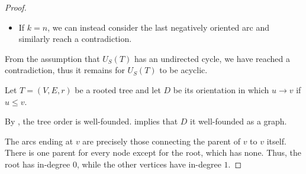 \begin{proof}
\begin{itemize}
    \item If \( k = n \), we can instead consider the last negatively oriented arc and similarly reach a contradiction.
  \end{itemize}

  From the assumption that \( U_S(T) \) has an undirected cycle, we have reached a contradiction, thus it remains for \( U_S(T) \) to be acyclic.

   Let \( T = (V, E, r) \) be a rooted tree and let \( D \) be its orientation in which \( u \to v \) if \( u \leq v \).

   By , the tree order is well-founded.  implies that \( D \) it well-founded as a graph.

   The arcs ending at \( v \) are precisely those connecting the parent of \( v \) to \( v \) itself. There is one parent for every node except for the root, which has none. Thus, the root has in-degree \( 0 \), while the other vertices have in-degree \( 1 \).
\end{proof}

